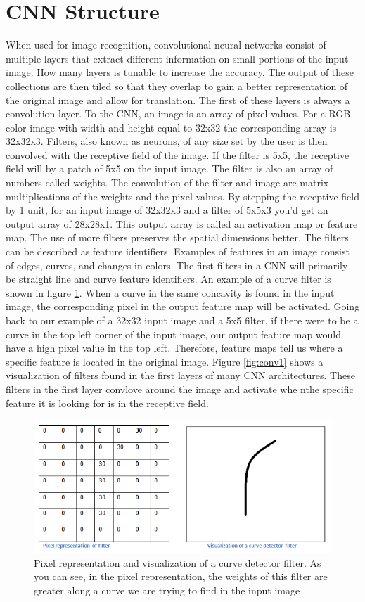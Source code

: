 \section{CNN Structure}
When used for image recognition, convolutional neural networks consist of multiple layers that extract different information on small portions of the input image. How many layers is tunable to increase the accuracy. The output of these collections are then tiled so that they overlap to gain a better representation of the original image and allow for translation. The first of these layers is always a convolution layer. To the CNN, an image is an array of pixel values. For a RGB color image with width and height equal to 32x32 the corresponding array is 32x32x3. Filters, also known as neurons, of any size set by the user is then convolved with the receptive field of the image. If the filter is 5x5, the receptive field will by a patch of 5x5 on the input image. The filter is also an array of numbers called weights. The convolution of the filter and image are matrix multiplications of the weights and the pixel values. By stepping the receptive field by 1 unit, for an input image of 32x32x3 and a filter of 5x5x3 you'd get an output array of 28x28x1. This output array is called an activation map or feature map. The use of more filters preserves the spatial dimensions better. The filters can be described as feature identifiers. Examples of features in an image consist of edges, curves, and changes in colors. The first filters in a CNN will primarily be straight line and curve feature identifiers. An example of a curve filter is shown in figure \ref{fig:curvedetector}. When a curve in the same concavity is found in the input image, the corresponding pixel in the output feature map will be activated. Going back to our example of a 32x32 input image and a 5x5 filter, if there were to be a curve in the top left corner of the input image, our output feature map would have a high pixel value in the top left. Therefore, feature maps tell us where a specific feature is located in the original image. Figure \ref{fig:conv1} shows a visualization of filters found in the first layers of many CNN architectures. These filters in the first layer convlove around the image and activate whe nthe specific feature it is looking for is in the receptive field. 
\begin{figure}[htp!]
\centering
\includegraphics[width=.6\textwidth]{figs/curvedetector.png}
\caption{Pixel representation and visualization of a curve detector filter. As you can see, in the pixel representation, the weights of this filter are greater along a curve we are trying to find in the input image}
\label{fig:curvedetector}
\end{figure} 

